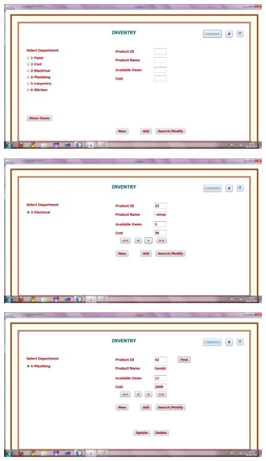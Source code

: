 \documentclass[12pt,a4paper]{report}
\begin{document}
\begin{center}
\includegraphics[scale=0.45]{19.png}
\end{center}
\begin{center}
\includegraphics[scale=0.45]{19_1.png}
\end{center}
\begin{center}
\includegraphics[scale=0.45]{19_2.png}
\end{center}
\end{document}
